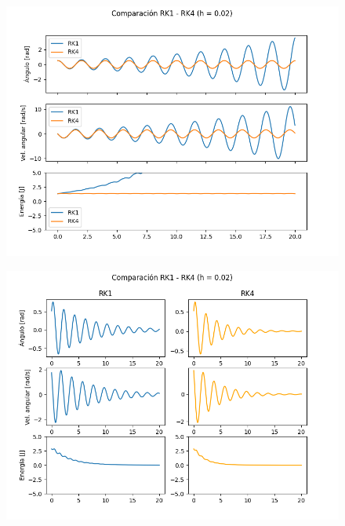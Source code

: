 \documentclass[titlepage,a4paper]{article}
\begin{document}
\begin{figure}[H]
    \centering
    \includegraphics[scale = 0.4]{noAmortiguado2.png}
    \caption{}
\end{figure}

\begin{figure}[H]
    \centering
    \includegraphics[scale = 0.4]{amortiguado1.png}
    \caption{}
\end{figure}
\end{document}
